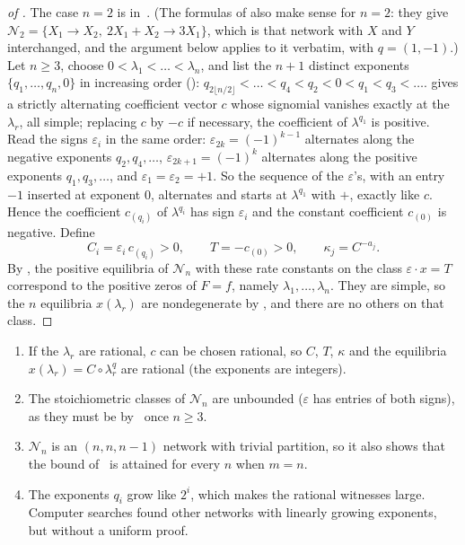 \documentclass[11pt,a4paper]{report}
\newcommand{\Net}{\mathcal N}
\begin{document}
\begin{proof}[of ]
The case \(n=2\) is in~\autocite[Remark~4.23]{BanajiFeliu2026}. (The formulas of  also make
sense for \(n=2\): they give \(\Net_2=\{X_1\to X_2,\ 2X_1+X_2\to3X_1\}\), which is that network with \(X\) and \(Y\)
interchanged, and the argument below applies to it verbatim, with \(q=(1,-1)\).) Let \(n\ge3\), choose
\(0<\lambda_1<\dots<\lambda_n\), and list the \(n+1\) distinct exponents \(\{q_1,\dots,q_n,0\}\) in increasing order
():
\(q_{2\lfloor n/2\rfloor}<\dots<q_4<q_2<0<q_1<q_3<\dots\).
 gives a strictly alternating coefficient vector \(c\) whose signomial vanishes exactly at
the \(\lambda_r\), all simple; replacing \(c\) by \(-c\) if necessary, the coefficient of \(\lambda^{q_1}\) is
positive. Read the signs \(\varepsilon_i\) in the same order: \(\varepsilon_{2k}=(-1)^{k-1}\) alternates along the
negative exponents \(q_2,q_4,\dots\), \(\varepsilon_{2k+1}=(-1)^k\) alternates along the positive exponents
\(q_1,q_3,\dots\), and \(\varepsilon_1=\varepsilon_2=+1\). So the sequence of the \(\varepsilon\)'s, with an entry \(-1\)
inserted at exponent \(0\), alternates and starts at \(\lambda^{q_1}\) with \(+\), exactly like \(c\). Hence the
coefficient \(c_{(q_i)}\) of \(\lambda^{q_i}\) has sign \(\varepsilon_i\) and the constant coefficient \(c_{(0)}\) is
negative. Define
\[
C_i=\varepsilon_i\,c_{(q_i)}>0,\qquad T=-c_{(0)}>0,\qquad \kappa_j=C^{-a_j}.
\]
By , the positive equilibria of \(\Net_n\) with these rate constants on the class
\(\varepsilon\cdot x=T\) correspond to the positive zeros of \(F=f\), namely \(\lambda_1,\dots,\lambda_n\). They are
simple, so the \(n\) equilibria \(x(\lambda_r)\) are nondegenerate by , and there are no others on
that class.
\end{proof}

\begin{remark}
\begin{enumerate}
\item If the \(\lambda_r\) are rational, \(c\) can be chosen rational, so \(C\), \(T\), \(\kappa\) and the equilibria
\(x(\lambda_r)=C\circ\lambda_r^q\) are rational (the exponents are integers).
\item The stoichiometric classes of \(\Net_n\) are unbounded (\(\varepsilon\) has entries of both signs), as they must
be by~\autocite[Corollary~4.21(ii)]{BanajiFeliu2026} once \(n\ge3\).
\item \(\Net_n\) is an \((n,n,n-1)\) network with trivial partition, so it also shows that the bound
of~\autocite[Theorem~4.20(i)]{BanajiFeliu2026} is attained for every \(n\) when \(m=n\).
\item The exponents \(q_i\) grow like \(2^i\), which makes the rational witnesses large. Computer searches found other
networks with linearly growing exponents, but without a uniform proof.
\end{enumerate}
\end{remark}
\end{document}
